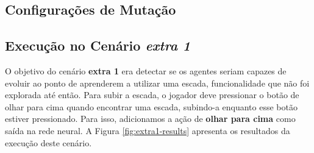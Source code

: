 \subsection{\label{section:experiment-mutation}Configurações de Mutação}


\subsection{\label{section:experiment-extra1}Execução no Cenário \textit{extra
1}}

O objetivo do cenário \textbf{extra 1} era detectar se os agentes seriam capazes
de evoluir ao ponto de aprenderem a utilizar uma escada, funcionalidade que não
foi explorada até então. Para subir a escada, o jogador deve pressionar o botão
de olhar para cima quando encontrar uma escada, subindo-a enquanto esse botão
estiver pressionado. Para isso, adicionamos a ação de \textbf{olhar para cima}
como saída na rede neural. A Figura \ref{fig:extra1-results} apresenta os
resultados da execução deste cenário.

